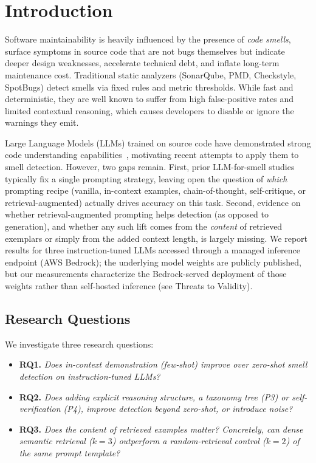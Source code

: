 \documentclass[conference]{IEEEtran}
\begin{document}
\section{Introduction}

Software maintainability is heavily influenced by the presence of \emph{code
smells}, surface symptoms in source code that are not bugs themselves but indicate
deeper design weaknesses, accelerate technical debt, and inflate long-term
maintenance cost. Traditional static analyzers
(SonarQube, PMD, Checkstyle, SpotBugs) detect smells via fixed rules and metric
thresholds. While fast and deterministic, they are well known to suffer from high
false-positive rates and limited contextual reasoning,
which causes developers to disable or ignore the warnings they emit.

Large Language Models (LLMs) trained on source code have demonstrated strong code
understanding capabilities~\cite{roziere2023codellama}, motivating recent attempts
to apply them to smell detection. However, two gaps remain. First, prior
LLM-for-smell studies typically fix a single prompting strategy, leaving open
the question of \emph{which} prompting recipe (vanilla, in-context examples,
chain-of-thought, self-critique, or retrieval-augmented) actually drives
accuracy on this task. Second, evidence on whether retrieval-augmented
prompting helps detection (as opposed to generation), and whether any such
lift comes from the \emph{content} of retrieved exemplars or simply from the
added context length, is largely missing. We report results for three
instruction-tuned LLMs accessed through a managed inference endpoint
(AWS Bedrock); the underlying model weights are publicly published, but our
measurements characterize the Bedrock-served deployment of those weights
rather than self-hosted inference (see Threats to Validity).

\subsection{Research Questions}
\noindent We investigate three research questions:
\begin{itemize}
 \item \textbf{RQ1.} \textit{Does in-context demonstration (few-shot) improve
 over zero-shot smell detection on instruction-tuned LLMs?}
 \item \textbf{RQ2.} \textit{Does adding explicit reasoning structure, a
 taxonomy tree (P3) or self-verification (P4), improve detection beyond
 zero-shot, or introduce noise?}
 \item \textbf{RQ3.} \textit{Does the \emph{content} of retrieved examples
 matter? Concretely, can dense semantic retrieval ($k{=}3$) outperform a
 random-retrieval control ($k{=}2$) of the same prompt template?}
\end{itemize}
\end{document}
